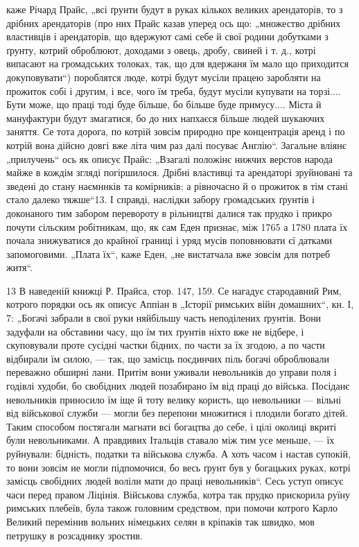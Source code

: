 каже Річард Прайс, „всі ґрунти будут в руках кількох великих арендаторів, то з дрібних арендаторів
(про них Прайс казав уперед ось що: „множество дрібних властивців і арендаторів, що вдержуют самі
себе й свої родини добутками з ґрунту, котрий оброблюют, доходами з овець, дробу, свиней і т. д.,
котрі випасают на громадських толоках, так, що для вдержаня їм мало що приходится докуповувати“)
пороблятся люде, котрі будут мусіли працею заробляти на прожиток собі і другим, і все, чого їм
треба, будут мусіли
купувати на торзі.... Бути може, що праці тоді буде більше, бо більше буде примусу.... Міста й
мануфактури будут змагатися, бо до них напхаєся більше людей шукаючих заняття. Се тота дорога, по
котрій зовсім природно пре концентрація аренд і по котрій вона дійсно довгі вже літа чим раз далі
посуває Англію“. Загальне вліянє „прилучень“ ось як описує Прайс: „Взагалі положінє нижчих верстов
народа майже в кождім згляді погіршилося. Дрібні властивці та арендаторі зруйновані та зведені до
стану наємннків та комірників; а рівночасно й о прожиток в тім стані стало далеко тяжше“13. І
справді, наслідки забору громадських ґрунтів і доконаного тим забором перевороту в рільництві далися
так прудко і прикро почути сільским робітникам, що, як сам Еден признає, між 1765 а 1780 плата їх
почала знижуватися до крайної границі і уряд мусів поповнювати єї датками запомоговими. „Плата їх“,
каже Еден, „не вистатчала вже зовсім для потреб житя“.

13 В наведеній книжці Р. Прайса, стор. 147, 159. Се нагадує стародавний Рим, котрого порядки ось як
описує Аппіан в „Історії римських війн домашних“, кн. І, 7: „Богачі забрали в свої руки няйбільшу
часть
неподілених ґрунтів. Вони задуфали на обставини часу, що їм тих ґрунтів ніхто вже не відбере, і
скуповували проте сусідні частки бідних, по
части за їх згодою, а по части відбирали їм силою, — так, що замісць
поєдинчих  піль богачі оброблювали переважно обширні лани. Притім
вони уживали невольників до управи поля і годівлі худоби, бо свобідних
людей позабирано  їм від праці до війська. Посіданє невольників приносило їм іще й тоту велику
користь, що невольники — вільні від військової служби — могли без перепони множитися і плодили
богато дітей. Таким способом постягали магнати всі богацтва до себе, і цілі околиці вкриті були
невольниками. А правдивих Італьців ставало між тим усе меньше, — їх руйнували: бідність, податки та
військова служба. А хоть часом і настав супокій, то вони зовсім не могли підпомочися, бо весь ґрунт
був у богацьких руках, котрі замісць свобідних людей воліли мати до праці невольників“. Сесь уступ
описує часи перед правом Ліцінія. Військова служба, котра так прудко прискорила руїну римських
плебеїв, була також головним средством, при помочи котрого Карло Великий перемінив вольних німецьких
селян в кріпаків так швидко, мов петрушку в розсаднику зростив.
